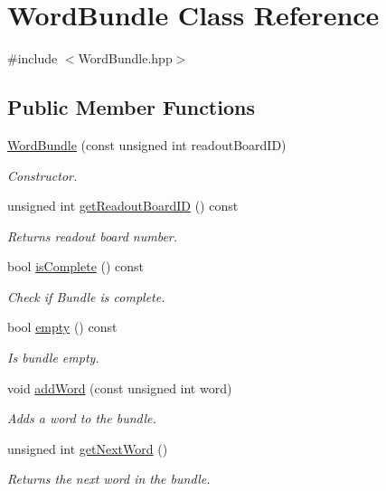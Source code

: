 \hypertarget{class_word_bundle}{}\section{Word\+Bundle Class Reference}
\label{class_word_bundle}


{\ttfamily \#include $<$Word\+Bundle.\+hpp$>$}

\subsection*{Public Member Functions}
\begin{DoxyCompactItemize}
\item 
\hyperlink{class_word_bundle_a56afa743b30e4b20775b7ecad180c465}{Word\+Bundle} (const unsigned int readout\+Board\+ID)
\begin{DoxyCompactList}\small\item\em Constructor. \end{DoxyCompactList}\item 
unsigned int \hyperlink{class_word_bundle_a595de21d0dabc8b99a8d28053c0370fc}{get\+Readout\+Board\+ID} () const
\begin{DoxyCompactList}\small\item\em Returns readout board number. \end{DoxyCompactList}\item 
bool \hyperlink{class_word_bundle_a0a817b8d4266b5c2418743bf46ef5dee}{is\+Complete} () const
\begin{DoxyCompactList}\small\item\em Check if Bundle is complete. \end{DoxyCompactList}\item 
bool \hyperlink{class_word_bundle_a18bcb8912a877fa9e60cd8ec707e75a3}{empty} () const
\begin{DoxyCompactList}\small\item\em Is bundle empty. \end{DoxyCompactList}\item 
void \hyperlink{class_word_bundle_a167d2b6b4f504e4347191a8e5bb47e5e}{add\+Word} (const unsigned int word)
\begin{DoxyCompactList}\small\item\em Adds a word to the bundle. \end{DoxyCompactList}\item 
unsigned int \hyperlink{class_word_bundle_a950e328fdf8b00e59b2d68da5182763f}{get\+Next\+Word} ()
\begin{DoxyCompactList}\small\item\em Returns the next word in the bundle. \end{DoxyCompactList}\item 

\end{DoxyCompactItemize}
